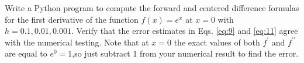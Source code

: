 \begin{problem} \label{P1.5}
Write a Python program to compute the forward and centered difference formulas for the first derivative of the function $f(x) = e^x $ at $x = 0$ with $h = 0.1, 0.01, 0.001$. Verify that the error estimates in Eqs. \ref{eq:9} and \ref{eq:11} agree with the numerical testing. Note that at $x =0$ the exact values of both $f^\prime$ and $f^{\prime\prime}$ are equal to $e^0 = 1$,so just subtract 1 from your numerical result to find the error.

\end{problem}

